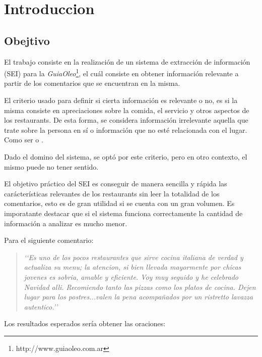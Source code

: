 \section{Introduccion}

\subsection{Obejtivo}

El trabajo consiste en la realización de un sistema de extracción de información (SEI) para la \emph{GuiaOleo}\footnote{http://www.guiaoleo.com.ar}, el cuál consiste en obtener información relevante a partir de los comentarios que se encuentran en la misma.

El criterio usado para definir si cierta información es relevante o no, es si la misma consiste en apreciaciones sobre la comida, el servicio y otros aspectos de los restaurants. De esta forma, se considera información irrelevante aquella que trate sobre la persona en sí o información que no esté relacionada con el lugar. Como ser  o .

Dado el domino del sistema, se optó por este criterio, pero en otro contexto, el mismo puede no tener sentido.

El objetivo práctico del SEI es conseguir de manera sencilla y rápida las carácterísticas relevantes de los restaurants sin leer la totalidad de los comentarios, esto es de gran utilidad si se cuenta con un gran volumen. Es imporatante destacar que si el sistema funciona correctamente la cantidad de información a analizar es mucho menor. 

Para el siguiente comentario:
\begin{quotation}
\emph{\lq\lq{}Es uno de los pocos restaurantes que sirve cocina italiana de verdad y actualiza su menu; la atencion, si bien llevada mayormente por chicas jovenes es sobria, amable y eficiente. Voy muy seguido y he celebrado Navidad alli. Recomiendo tanto las pizzas como los platos de cocina. Dejen lugar para los postres...valen la pena acompañados por un ristretto lavazza autentico.\rq\rq{}}
\end{quotation}

Los resultados esperados sería obtener las oraciones:

